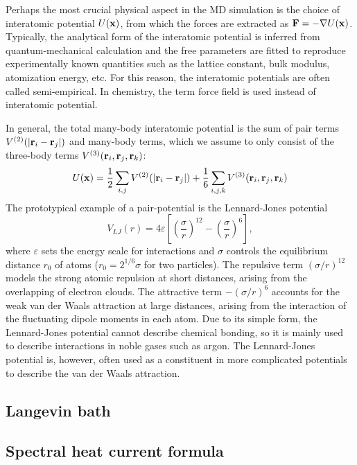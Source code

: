 Perhaps the most crucial physical aspect in the MD simulation is the choice of interatomic potential $U(\mathbf{x})$, from which the forces are extracted as $\mathbf{F}=-\nabla U(\mathbf{x})$. Typically, the analytical form of the interatomic potential is inferred from quantum-mechanical calculation and the free parameters are fitted to reproduce experimentally known quantities such as the lattice constant, bulk modulus, atomization energy, etc. For this reason, the interatomic potentials are often called semi-empirical. In chemistry, the term force field is used instead of interatomic potential.

In general, the total many-body interatomic potential is the sum of pair terms $V^{(2)}(|\mathbf{r}_{i}-\mathbf{r}_j|)$ and many-body terms, which we assume to only consist of the three-body terms $V^{(3)}(\mathbf{r}_i,\mathbf{r}_j,\mathbf{r}_k)$:
\begin{equation}
 U(\mathbf{x}) = \frac{1}{2}  \sum_{ i,j } V^{(2)}(|\mathbf{r}_{i}-\mathbf{r}_j|) + \frac{1}{6} \sum_{i,j,k} V^{(3)}(\mathbf{r}_i,\mathbf{r}_j,\mathbf{r}_k)
\end{equation}
The prototypical example of a pair-potential is the Lennard-Jones potential
\begin{equation}
 V_{LJ}(r) = 4\varepsilon \left[\left( \frac{\sigma}{r}\right)^{12}-\left( \frac{\sigma}{r}\right)^6  \right],
\end{equation}
where $\varepsilon$ sets the energy scale for interactions and $\sigma$ controls the equilibrium distance $r_0$ of atoms ($r_0=2^{1/6}\sigma$ for two particles). The repulsive term $(\sigma/r)^{12}$ models the strong atomic repulsion at short distances, arising from the overlapping of electron clouds. The attractive term $-(\sigma/r)^{6}$ accounts for the weak van der Waals attraction at large distances, arising from the interaction of the fluctuating dipole moments in each atom. Due to its simple form, the Lennard-Jones potential cannot describe chemical bonding, so it is mainly used to describe interactions in noble gases such as argon. The Lennard-Jones potential is, however, often used as a constituent in more complicated potentials to describe the van der Waals attraction.

\subsection{Langevin bath}

\subsection{Spectral heat current formula}

